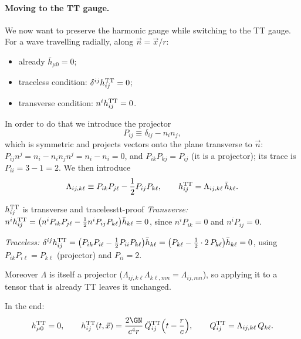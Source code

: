\paragraph{Moving to the TT gauge.} We now want to preserve the harmonic gauge while switching to the TT gauge. For a wave travelling radially, along $\vec n=\vec x/r$:
\begin{itemize}[nosep]
\item already $\bar h_{\mu0}=0$;
\item traceless condition: $\delta^{ij}h^{\rm TT}_{ij}=0$;
\item transverse condition: $n^ih^{\rm TT}_{ij}=0$.
\end{itemize}
In order to do that we introduce the projector
\begin{equation}
  P_{ij}\equiv\delta_{ij}-n_in_j ,
\end{equation}
which is symmetric and projects vectors onto the plane transverse to $\vec n$: $P_{ij}n^j=n_i-n_in_jn^j=n_i-n_i=0$, and $P_{ik}P_{kj}=P_{ij}$ (it is a projector); its trace is $P_{ii}=3-1=2$. We then introduce
\begin{equation}
  \Lambda_{ij,k\ell}\equiv P_{ik}P_{j\ell}-\frac12P_{ij}P_{k\ell},\qquad h^{\rm TT}_{ij}=\Lambda_{ij,k\ell}\,\bar h_{k\ell}.
\end{equation}
\begin{exercise}{$h^{\rm TT}_{ij}$ is transverse and traceless}{tt-proof}
\textit{Transverse:} $n^ih^{\rm TT}_{ij}=\big(n^iP_{ik}P_{j\ell}-\frac12n^iP_{ij}P_{k\ell}\big)\bar h_{k\ell}=0$, since $n^iP_{ik}=0$ and $n^iP_{ij}=0$.

\textit{Traceless:} $\delta^{ij}h^{\rm TT}_{ij}=\big(P_{ik}P_{i\ell}-\frac12P_{ii}P_{k\ell}\big)\bar h_{k\ell}=\big(P_{k\ell}-\frac12\cdot2\,P_{k\ell}\big)\bar h_{k\ell}=0$, using $P_{ik}P_{i\ell}=P_{k\ell}$ (projector) and $P_{ii}=2$.

Moreover $\Lambda$ is itself a projector ($\Lambda_{ij,k\ell}\Lambda_{k\ell,mn}=\Lambda_{ij,mn}$), so applying it to a tensor that is already TT leaves it unchanged.
\end{exercise}

\begin{keyresult}
In the end:
\begin{equation}
  h^{\rm TT}_{\mu0}=0,\qquad h^{\rm TT}_{ij}(t,\vec x)=\frac{2\GN}{c^4r}\,\ddot Q^{\rm TT}_{ij}\Big(t-\frac rc\Big),\qquad Q^{\rm TT}_{ij}=\Lambda_{ij,k\ell}\,Q_{k\ell}.
\end{equation}
\end{keyresult}

